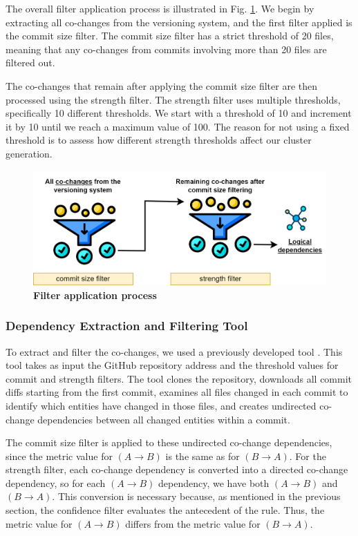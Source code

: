 \documentclass{ieeeaccess}
\begin{document}
The overall filter application process is illustrated in Fig. \ref{fig:filtering}.  We begin by extracting all co-changes from the versioning system, and the first filter applied is the commit size filter. The commit size filter has a strict threshold of 20 files, meaning that any co-changes from commits involving more than 20 files are filtered out.

The co-changes that remain after applying the commit size filter are then processed using the strength filter. The strength filter uses multiple thresholds, specifically 10 different thresholds. We start with a threshold of 10 and increment it by 10 until we reach a maximum value of 100. The reason for not using a fixed threshold is to assess how different strength thresholds affect our cluster generation. 

\begin{figure}[t!]
  \centering
  \includegraphics[width=\columnwidth]{filtering.png}
  \caption{ \textbf{Filter application process}}
  \label{fig:filtering}
\end{figure}

\subsubsection{Dependency Extraction and Filtering Tool}

To extract and filter the co-changes, we used a previously developed tool \cite{b4}. This tool takes as input the GitHub repository address and the threshold values for commit and strength filters. The tool clones the repository, downloads all commit diffs starting from the first commit, examines all files changed in each commit to identify which entities have changed in those files, and creates undirected co-change dependencies between all changed entities within a commit.

The commit size filter is applied to these undirected co-change dependencies, since the metric value for $(A \rightarrow B)$ is the same as for $(B \rightarrow A)$. For the strength filter, each co-change dependency is converted into a directed co-change dependency, so for each $(A \rightarrow B)$ dependency, we have both $(A \rightarrow B)$ and $(B \rightarrow A)$. This conversion is necessary because, as mentioned in the previous section, the confidence filter evaluates the antecedent of the rule. Thus, the metric value for $(A \rightarrow B)$ differs from the metric value for $(B \rightarrow A)$. 
\end{document}
